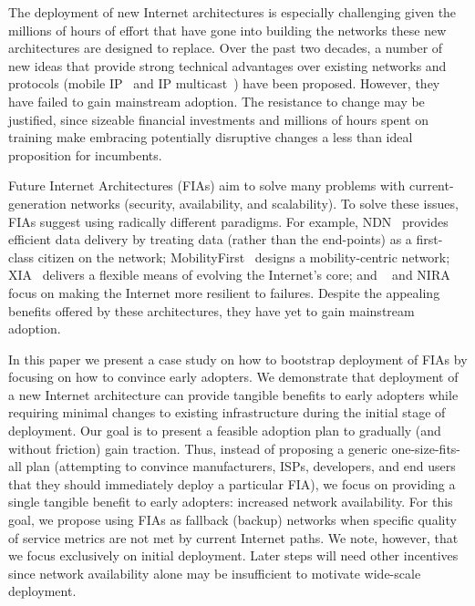 The deployment of new Internet architectures is especially challenging given
the millions of hours of effort that have gone into building the networks these
new architectures are designed to replace.  Over the past two decades, a number
of new ideas that provide strong technical advantages over existing networks
and protocols (\eg mobile IP~\cite{rfc5944} and IP multicast~\cite{rfc1112})
have been proposed.  However, they have failed to gain mainstream adoption. The
resistance to change may be justified, since sizeable financial investments and
millions of hours spent on training make embracing potentially disruptive
changes a less than ideal proposition for incumbents. 

Future Internet Architectures (FIAs) aim to solve many problems with
current-generation networks (\eg security, availability, and scalability). To
solve these issues, FIAs suggest using radically different paradigms.  For
example, NDN~\cite{Jacobson:2009:NNC:1658939.1658941} provides efficient data
delivery by treating data (rather than the end-points) as a first-class citizen
on the network; MobilityFirst~\cite{Raychaudhuri:2012:MRT:2412096.2412098}
designs a mobility-centric network; XIA~\cite{Han2012} delivers a flexible
means of evolving the Internet's core; and \scion~\cite{scion2011} and
NIRA~\cite{nira2003} focus on making the Internet more resilient to failures.
Despite the appealing benefits offered by these architectures, they have yet to
gain mainstream adoption.

In this paper we present a case study on how to bootstrap deployment of FIAs by
focusing on how to convince early adopters. We demonstrate that deployment of a
new Internet architecture can provide tangible benefits to early adopters while
requiring minimal changes to existing infrastructure during the initial stage
of deployment.  Our goal is to present a feasible adoption plan to gradually
(and without friction) gain traction. Thus, instead of proposing a generic
one-size-fits-all plan (\ie attempting to convince manufacturers, ISPs,
developers, and end users that they should immediately deploy a particular
FIA), we focus on providing a single tangible benefit to early adopters:
increased network availability.  For this goal, we propose using FIAs as
fallback (backup) networks when specific quality of service metrics are not met
by current Internet paths. We note, however, that we focus exclusively on
initial deployment. Later steps will need other incentives since network
availability alone may be insufficient to motivate wide-scale deployment. 

